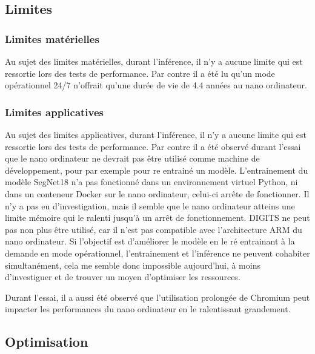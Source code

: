 \subsection{Limites}
\subsubsection{Limites matérielles}
\par Au sujet des limites matérielles, durant l'inférence, il n'y a aucune limite qui est ressortie lors des tests de performance. Par contre il a été lu qu'un mode opérationnel 24/7 n'offrait qu'une durée de vie de 4.4 années au nano ordinateur. 
\subsubsection{Limites applicatives}
\par Au sujet des limites applicatives, durant l'inférence, il n'y a aucune limite qui est ressortie lors des tests de performance. Par contre il a été observé durant l'essai que le nano ordinateur ne devrait pas être utilisé comme machine de développement, pour par exemple pour re entrainé un modèle. L'entrainement du modèle SegNet18 n'a pas fonctionné dans un environnement virtuel Python, ni dans un conteneur Docker sur le nano ordinateur, celui-ci arrête de fonctionner. Il n'y a pas eu d'investigation, mais il semble que le nano ordinateur atteins une limite mémoire qui le ralenti jusqu'à un arrêt de fonctionnement. DIGITS ne peut pas non plus être utilisé, car il n'est pas compatible avec l'architecture ARM du nano ordinateur. Si l'objectif est d'améliorer le modèle en le ré entrainant à la demande en mode opérationnel, l'entrainement et l'inférence ne peuvent cohabiter simultanément, cela me semble donc impossible aujourd'hui, à moins d'investiguer et de trouver un moyen d'optimiser les ressources.
\par Durant l'essai, il a aussi été observé que l'utilisation prolongée de Chromium peut impacter les performances du nano ordinateur en le ralentissant grandement. 
\subsection{Optimisation}
